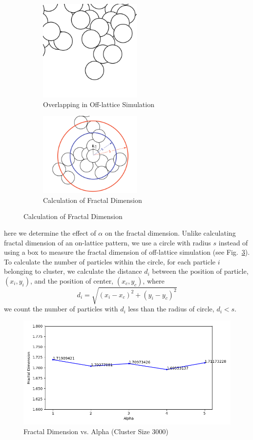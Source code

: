 \documentclass[aps,preprint,groupedaddress,letterpaper]{revtex4-1}
\begin{document}
\begin{figure}[h]
     \centering
     \begin{subfigure}[h]{0.45\textwidth}
         \centering
        \includegraphics[width=2.0in]{img/alpha/ol.png}
        \caption{Overlapping in Off-lattice Simulation
        \label{ol}}
     \end{subfigure}
     \hfill
     \begin{subfigure}[h]{0.45\textwidth}
         \centering
        \includegraphics[width=2.0in]{img/sr.jpg}
        \caption{Calculation of Fractal Dimension
        \label{dfr}}
     \end{subfigure}
\end{figure}


here we determine the effect of $\alpha$ on the fractal dimension. Unlike calculating fractal dimension of an on-lattice pattern, we use a circle with radius $s$ instead of using a box to measure the fractal dimension of off-lattice simulation  (see Fig.~\ref{dfr}). To calculate the number of particles within the circle, for each particle $i$ belonging to cluster, we calculate the distance $d_i$ between the position of particle, $(x_i,y_i)$, and the position of center, $(x_c,y_c)$, where
\[
d_i = \sqrt{(x_i-x_c)^2+(y_i-y_c)^2}
\]
we count the number of particles with $d_i$ less than the radius of circle, $d_i<s$.

\begin{figure}[h]
\centering
\includegraphics[width=5.0in]{img/alpha/dfalpha.png}
\caption{Fractal Dimension vs. Alpha (Cluster Size 3000)
\label{dfa}}
\end{figure}
\end{document}
